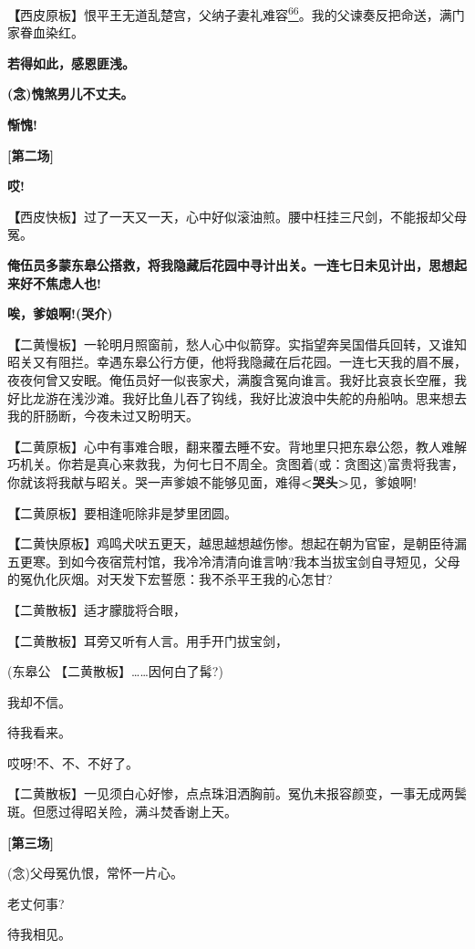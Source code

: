 \textbf{【}西皮原板】恨平王无道乱楚宫，父纳子妻礼难容\protect\hyperlink{fn66}{\textsuperscript{66}}。我的父谏奏反把命送，满门家眷血染红。

\textbf{若得如此，感恩匪浅。}

\textbf{(念)愧煞男儿不丈夫。}

\textbf{惭愧!}

\textbf{{[}第二场{]}}

\textbf{哎!}

\textbf{【}西皮快板】过了一天又一天，心中好似滚油煎。腰中枉挂三尺剑，不能报却父母冤。

\textbf{俺伍员多蒙东皋公搭救，将我隐藏后花园中寻计出关。一连七日未见计出，思想起来好不焦虑人也!}

\textbf{唉，爹娘啊!(哭介)}

\textbf{【}二黄慢板】一轮明月照窗前，愁人心中似箭穿。实指望奔吴国借兵回转，又谁知昭关又有阻拦。幸遇东皋公行方便，他将我隐藏在后花园。一连七天我的眉不展，夜夜何曾又安眠。俺伍员好一似丧家犬，满腹含冤向谁言。我好比哀哀长空雁，我好比龙游在浅沙滩。我好比鱼儿吞了钩线，我好比波浪中失舵的舟船呐。思来想去我的肝肠断，今夜未过又盼明天。

\textbf{【}二黄原板】心中有事难合眼，翻来覆去睡不安。背地里只把东皋公怨，教人难解巧机关。你若是真心来救我，为何七日不周全。贪图着(或：贪图这)富贵将我害，你就该将我献与昭关。哭一声爹娘不能够见面，难得\textbf{\textless{}哭头\textgreater{}}见，爹娘啊!

\textbf{【}二黄原板】要相逢呃除非是梦里团圆。

\textbf{【}二黄快原板】鸡鸣犬吠五更天，越思越想越伤惨。想起在朝为官宦，是朝臣待漏五更寒。到如今夜宿荒村馆，我冷冷清清向谁言呐?我本当拔宝剑自寻短见，父母的冤仇化灰烟。对天发下宏誓愿：我不杀平王我的心怎甘?

【二黄散板】适才朦胧将合眼，

【二黄散板】耳旁又听有人言。用手开门拔宝剑，

(东皋公 【二黄散板】\ldots{}\ldots{}因何白了髯?)

我却不信。

待我看来。

哎呀!不、不、不好了。

【二黄散板】一见须白心好惨，点点珠泪洒胸前。冤仇未报容颜变，一事无成两鬓斑。但愿过得昭关险，满斗焚香谢上天。

\textbf{{[}第三场{]}}

(念)父母冤仇恨，常怀一片心。

老丈何事?

待我相见。

